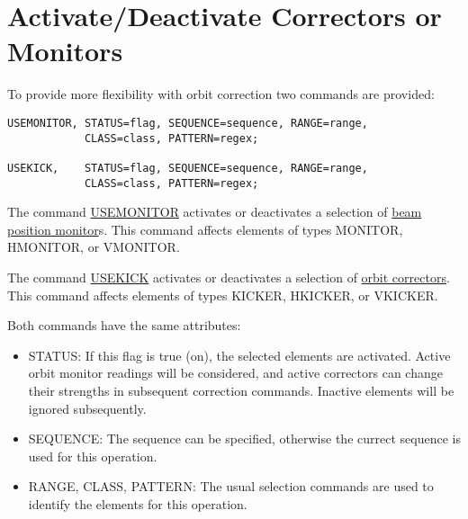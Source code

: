 
\section{Activate/Deactivate Correctors or Monitors}
To provide more flexibility with orbit correction two commands are
provided:  

\begin{verbatim}
USEMONITOR, STATUS=flag, SEQUENCE=sequence, RANGE=range, 
            CLASS=class, PATTERN=regex;

USEKICK,    STATUS=flag, SEQUENCE=sequence, RANGE=range,
            CLASS=class, PATTERN=regex;
\end{verbatim}

The command \href{monitor}{USEMONITOR} activates or deactivates a
selection of \href{../Introduction/monitors.html}{beam position
 monitor}s. This command affects elements of types MONITOR, HMONITOR,
or VMONITOR.    

The command  \href{kick}{USEKICK} activates or deactivates a selection
of \href{../Introduction/kickers.html}{orbit correctors}. This command
affects elements of types KICKER, HKICKER, or VKICKER.   



Both commands have the same attributes: 
\begin{itemize}
   \item STATUS: If this flag is true (on), the selected elements
     are activated. Active orbit monitor readings will be
     considered, and active correctors can change their strengths
     in subsequent correction commands. Inactive elements will be
     ignored subsequently.  
   \item SEQUENCE: The sequence can be specified, otherwise the
     currect sequence is used for this operation.  
   \item RANGE, CLASS, PATTERN: The usual selection commands are
     used to identify the elements for this operation.  
\end{itemize} 

